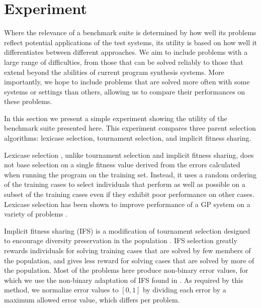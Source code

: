 \documentclass{sig-alternate}
\begin{document}
\section{Experiment}

Where the relevance of a benchmark suite is determined by how well its problems reflect potential applications of the test systems, its utility is based on how well it differentiates between different approaches. We aim to include problems with a large range of difficulties, from those that can be solved reliably to those that extend beyond the abilities of current program synthesis systems. More importantly, we hope to include problems that are solved more often with some systems or settings than others, allowing us to compare their performances on these problems.

In this section we present a simple experiment showing the utility of the benchmark suite presented here. This experiment compares three parent selection algorithms: lexicase selection, tournament selection, and implicit fitness sharing.

Lexicase selection \cite{Helmuth:2014:ieeeTEC, Spector:2012:APM:2330784.2330846}, %
 unlike tournament selection and implicit fitness sharing, does not base selection on a single fitness value derived from the errors calculated when running the program on the training set. Instead, it uses a random ordering of the training cases to select individuals that perform as well as possible on a subset of the training cases even if they exhibit poor performance on other cases. Lexicase selection has been shown to improve performance of a GP system on a variety of problems \cite{Helmuth:2014:ieeeTEC, Helmuth:2014:GECCO, Helmuth:2013:GECCOcomp}. %

Implicit fitness sharing (IFS) is a modification of tournament selection designed to encourage diversity preservation in the population \cite{McKay:2000:GECCO}. IFS selection greatly rewards individuals for solving training cases that are solved by few members of the population, and gives less reward for solving cases that are solved by more of the population. Most of the problems here produce non-binary error values, for which we use the non-binary adaptation of IFS found in \cite{Krawiec:2013:EvoIASP}. As required by this method, we normalize error values to $[0, 1]$ by dividing each error by a maximum allowed error value, which differs per problem. 
\end{document}
